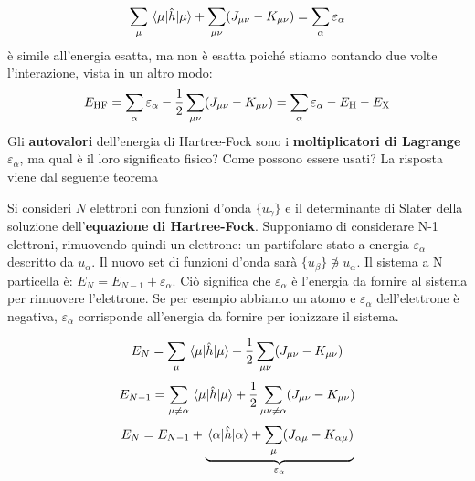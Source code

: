 \begin{equation*}
    \sum_\mu\mel{\mu}{\hat h}{\mu}+\sum_{\mu\nu}(J_{\mu\nu}-K_{\mu\nu})=\sum_\alpha \varepsilon_\alpha
\end{equation*}
è simile all'energia esatta, ma non è esatta poiché stiamo contando due volte l'interazione, vista in un altro modo:
\begin{equation*}
    E_{\text{HF}}=\sum_\alpha\varepsilon_\alpha-\frac 12\sum_{\mu\nu}(J_{\mu\nu}-K_{\mu\nu})=\sum_\alpha\varepsilon_\alpha-E_{\text H}-E_{\text X}
\end{equation*}
Gli \textbf{autovalori} dell'energia di Hartree-Fock sono i \textbf{moltiplicatori di Lagrange} $\varepsilon_\alpha$, ma qual è il loro significato fisico? Come possono essere usati? La risposta viene dal seguente teorema
\begin{theorem}
    Si consideri $N$ elettroni con funzioni d'onda $\{u_\gamma\}$ e il determinante di Slater della soluzione dell'\textbf{equazione di Hartree-Fock}. Supponiamo di considerare N-1 elettroni, rimuovendo quindi un elettrone: un partifolare stato a energia $\varepsilon_\alpha$ descritto da $u_\alpha$. Il nuovo set di funzioni d'onda sarà $\{u_\beta\}\not\owns u_\alpha$. Il sistema a N particella è: $E_N=E_{N-1}+\varepsilon_\alpha$. Ciò significa che $\varepsilon_\alpha$ è l'energia da fornire al sistema per rimuovere l'elettrone. Se per esempio abbiamo un atomo e $\varepsilon_\alpha$ dell'elettrone è negativa, $\varepsilon_\alpha$ corrisponde all'energia da fornire per ionizzare il sistema.
\end{theorem}
\begin{prf}
    \begin{equation*}
        E_N=\sum_\mu\mel{\mu}{\hat h}{\mu}+\frac 12\sum_{\mu\nu}(J_{\mu\nu}-K_{\mu\nu})
    \end{equation*}
    \begin{equation*}
        E_{N-1}=\sum_{\mu\neq\alpha}\mel{\mu}{\hat h}{\mu}+\frac 12\sum_{\mu\nu\neq \alpha}(J_{\mu\nu}-K_{\mu\nu})
    \end{equation*}
    \begin{equation*}
        E_N=E_{N-1}+\underbrace{\mel{\alpha}{\hat h}{\alpha}+\sum_\mu(J_{\alpha\mu}-K_{\alpha\mu})}_{\varepsilon_\alpha}
    \end{equation*}
\end{prf}
